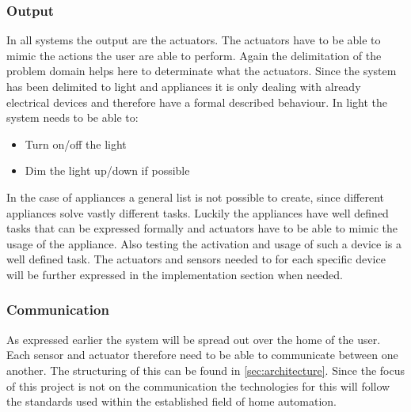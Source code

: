 \subsubsection{Output}
In all systems the output are the actuators. The actuators have to be able to mimic the actions the user are able to perform. Again the delimitation of the problem domain helps here to determinate what the actuators. Since the system has been delimited to light and appliances it is only dealing with already electrical devices and therefore have a formal described behaviour. In light the system needs to be able to:
\begin{itemize}
	\item Turn on/off the light
	\item Dim the light up/down if possible
\end{itemize}
In the case of appliances a general list is not possible to create, since different appliances solve vastly different tasks. Luckily the appliances have well defined tasks that can be expressed formally and actuators have to be able to mimic the usage of the appliance. Also testing the activation and usage of such a device is a well defined task. The actuators and sensors needed to for each specific device will be further expressed in the implementation section when needed.

\subsubsection{Communication}
As expressed earlier the system will be spread out over the home of the user. Each sensor and actuator therefore need to be able to communicate between one another. The structuring of this can be found in \cref{sec:architecture}. Since the focus of this project is not on the communication the technologies for this will follow the standards used within the established field of home automation.
